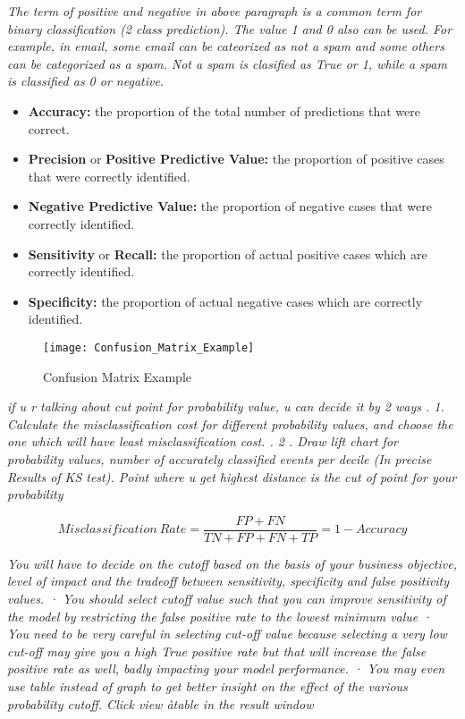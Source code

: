 \textit{The term of positive and negative in above paragraph is a common term for binary classification (2 class prediction). The value 1 and 0 also can be used. For example, in email, some email can be cateorized as not a spam and some others can be categorized as a spam. Not a spam is clasified as True or 1, while a spam is classified as 0 or negative.}

\begin{itemize}
	\item \textbf{Accuracy:} the proportion  of the total number of predictions that were correct.
	\item \textbf{Precision} or \textbf{Positive Predictive Value:} the proportion of positive cases that were correctly identified.
	\item \textbf{Negative Predictive Value:} the proportion of negative cases that were correctly identified.
	\item \textbf{Sensitivity} or \textbf{Recall:} the proportion of actual positive cases which are correctly identified.
	\item \textbf{Specificity:} the proportion of actual negative cases which are correctly identified.
\end{itemize}

\begin{figure}[H]
	\texttt{[image: Confusion\_Matrix\_Example]}
	\caption[Confusion Matrix Example]
	{Confusion Matrix Example}
	\label{fig:ConfusionMatrixExample}
\end{figure}

\textit{if u r talking about cut point for probability value, u can decide it by 2 ways .
	1. Calculate the misclassification cost for different probability values, and choose the one which will have least misclassification cost. .
	2 . Draw lift chart for probability values, number of accurately classified events per decile (In precise Results of KS test). Point where u get highest distance is the cut of point for your probability	
}

\begin{equation}
	Misclassification\ Rate = \frac{FP + FN}{TN + FP + FN + TP} = 1 - Accuracy
\end{equation}


\textit{You will have to decide on the cutoff based on the basis of your business objective, level of impact and the tradeoff between sensitivity, specificity and false positivity values. · You should select cutoff value such that you can improve sensitivity of the model by restricting the false positive rate to the lowest minimum value · You need to be very careful in selecting cut-off value because selecting a very low cut-off may give you a high True positive rate but that will increase the false positive rate as well, badly impacting your model performance. · You may even use table instead of graph to get better insight on the effect of the various probability cutoff. Click view àtable in the result window}

